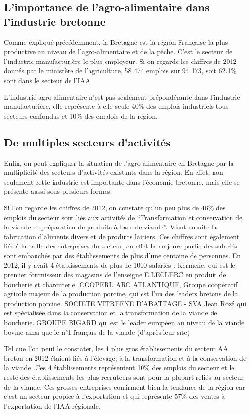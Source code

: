 \documentclass[a4paper,10pt]{report}
\begin{document}
	
		\subsection{L'importance de l'agro-alimentaire dans l'industrie bretonne}
			Comme expliqué précédemment, la Bretagne est la région Française la plus productive au niveau de l’agro-alimentaire et de la pêche. C’est le secteur de l’industrie manufacturière le plus employeur. Si on regarde les chiffres de 2012 donnés par le ministère de l’agriculture, 58 474 emplois sur 94 173, soit 62.1\% sont dans le secteur de l’IAA.
			
			L’industrie agro-alimentaire n’est pas seulement prépondérante dans l’industrie manufacturière, elle représente à elle seule 40\% des emplois industriels tous secteurs confondus et 10\% des emplois de la région.
			
		\subsection{De multiples secteurs d'activités}
			Enfin, on peut expliquer la situation de l'agro-alimentaire en Bretagne par la multiplicité des secteurs d'activités existants dans la région. En effet, non seulement cette industrie est importante dans l'économie bretonne, mais elle se présente aussi sous plusieurs formes.
			
			
			Si l’on regarde les chiffres de 2012, on constate qu’un peu plus de 46\% des emplois du secteur sont liés aux activités de  “Transformation et conservation de la viande et préparation de produits à base de viande”. Vient ensuite la fabrication d’aliments divers et de produits laitiers. Ces chiffres sont également liés à la taille des entreprises du secteur, en effet la majeure partie des salariés sont embauchés par des établissements de plus d’une centaine de personnes. En 2012, il y avait 4 établissements de plus de 1000 salariés :
			Kermene, qui est le premier fournisseur des magasins de l’enseigne E.LECLERC en produit de boucherie et charcuterie.
			COOPERL ARC ATLANTIQUE, Groupe coopératif agricole majeur de la production porcine, qui est l’un des leaders bretons de la production porcine.
			SOCIETE VITREENE D’ABATTAGE - SVA Jean Rozé qui est spécialisée dans la conservation et la transformation de la viande de boucherie.
			GROUPE BIGARD qui est le leader européen au niveau de la viande bovine ainsi que le n°1 français de la viande (d’après leur site)
			
			Tel que l’on peut le constater, les 4 plus gros établissements du secteur AA breton en 2012 étaient liés à l’élevage, à la transformation et à la conservation de la viande. Ces 4 établissements représentent 10\% des emplois du secteur et le reste des établissements les plus recruteurs sont pour la plupart reliés au secteur de la viande. Ces grosses entreprises confirment bien la tendance de la région car c’est un secteur propice à l’exportation et qui représente 57\% des ventes à l’exportation de l’IAA régionale.
			
\end{document}
